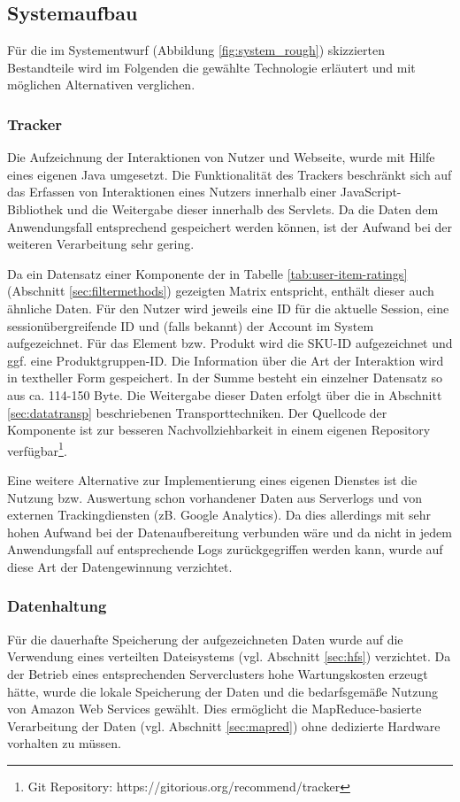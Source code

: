 \subsection{Systemaufbau}

Für die im Systementwurf (Abbildung \ref{fig:system_rough}) skizzierten Bestandteile wird im Folgenden die gewählte Technologie erläutert und mit möglichen Alternativen verglichen.

\subsubsection{Tracker} \label{sec:tracker-impl} Die Aufzeichnung der Interaktionen von Nutzer und Webseite, wurde mit Hilfe eines eigenen Java  umgesetzt. Die Funktionalität des Trackers beschränkt sich auf das Erfassen von Interaktionen eines Nutzers innerhalb einer JavaScript-Bibliothek und die Weitergabe dieser innerhalb des Servlets. Da die Daten dem Anwendungsfall entsprechend gespeichert werden können, ist der Aufwand bei der weiteren Verarbeitung sehr gering.

Da ein Datensatz einer Komponente der in Tabelle \ref{tab:user-item-ratings} (Abschnitt \ref{sec:filtermethods}) gezeigten Matrix entspricht, enthält dieser auch ähnliche Daten. Für den Nutzer wird jeweils eine ID für die aktuelle Session, eine sessionübergreifende ID und (falls bekannt) der Account im System aufgezeichnet. Für das Element bzw. Produkt wird die \gls{SKU-ID} aufgezeichnet und ggf. eine Produktgruppen-\gls{ID}. Die Information über die Art der Interaktion wird in textheller Form gespeichert. In der Summe besteht ein einzelner Datensatz so aus ca. 114-150 Byte. Die Weitergabe dieser Daten erfolgt über die in Abschnitt \ref{sec:datatransp} beschriebenen Transporttechniken. Der Quellcode der Komponente ist zur besseren Nachvollziehbarkeit in einem eigenen Repository verfügbar\footnote{Git Repository: https://gitorious.org/recommend/tracker}.

Eine weitere Alternative zur Implementierung eines eigenen Dienstes ist die Nutzung bzw. Auswertung schon vorhandener Daten aus Serverlogs und von externen Trackingdiensten (zB. Google Analytics). Da dies allerdings mit sehr hohen Aufwand bei der Datenaufbereitung verbunden wäre und da nicht in jedem Anwendungsfall auf entsprechende Logs zurückgegriffen werden kann, wurde auf diese Art der Datengewinnung verzichtet.

\subsubsection{Datenhaltung} Für die dauerhafte Speicherung der aufgezeichneten Daten wurde auf die Verwendung eines verteilten Dateisystems (vgl. Abschnitt \ref{sec:hfs}) verzichtet. Da der Betrieb eines entsprechenden Serverclusters hohe Wartungskosten erzeugt hätte, wurde die lokale Speicherung der Daten und die bedarfsgemäße Nutzung von Amazon Web Services gewählt. Dies ermöglicht die MapReduce-basierte Verarbeitung der Daten (vgl. Abschnitt \ref{sec:mapred}) ohne dedizierte Hardware vorhalten zu müssen.

